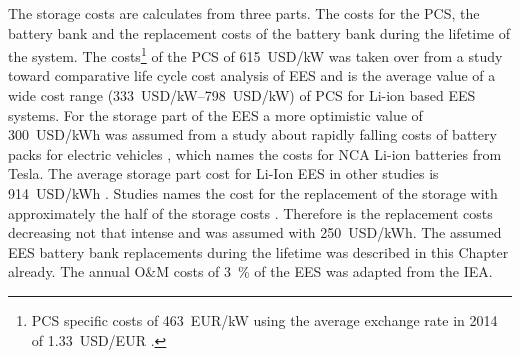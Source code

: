 The storage costs are calculates from three  parts. The costs for the PCS, the battery bank and the replacement costs of the battery bank during the lifetime of the system. The costs\footnote{PCS specific costs of \SI{463}{EUR/kW} \cite{Zakeri2015} using the average exchange rate in 2014 of \SI{1.33}{USD/EUR} \cite{StatistaGmbH2015}.} of the PCS of \SI{615}{USD/kW} was taken over from a study toward comparative life cycle cost analysis of EES \cite{Zakeri2015} and is the average value of a wide cost range (\SIrange{333}{798}{USD/kW}) of PCS for Li-ion based EES systems. For the storage part of the EES a more optimistic value of \SI{300}{USD/kWh} was assumed from a study about rapidly falling costs of battery packs for electric vehicles \cite{Nykvist2015}, which names the costs for NCA Li-ion batteries from Tesla. The average storage part cost for Li-Ion EES in other studies is \SI{914}{USD/kWh} \cite{Zakeri2015}. Studies names the cost for the replacement of the storage with approximately the half of the storage costs \cite{Zakeri2015}. Therefore is the replacement costs decreasing not that intense and was assumed with \SI{250}{USD/kWh}. The assumed EES battery bank replacements during the lifetime was described in this Chapter already. The annual O\&M costs of \SI{3}{\percent} of the EES was adapted from the IEA. \cite{IEA2014c}

